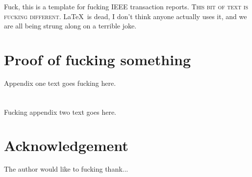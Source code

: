 \documentclass[journal,transmag]{IEEEtran}
\begin{document}
		{F}{uck}, this is a template for fucking IEEE transaction reports. \textsc{This bit of text is fucking different.} \LaTeX\ is dead, I don't think anyone actually uses it, and we are all being strung along on a terrible joke.
	
	\newpage
	
	\appendices
	\section{Proof of fucking something}
	Appendix one text goes fucking here.
	
	
	\section{}
	Fucking appendix two text goes here.
	
	\section*{Acknowledgement}
	The author would like to fucking thank...
	
	
	
	
\end{document}
